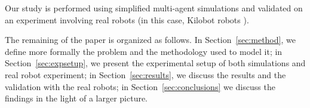 \documentclass[sigconf]{acmart}
\begin{document}
Our study is performed using simplified multi-agent simulations and validated on an experiment involving real robots (in this case, Kilobot robots \cite{Rubenstein2012kilobot}).

The remaining of the paper is organized as follows. In Section~\ref{sec:method}, we define more formally the problem and the methodology used to model it; in Section~\ref{sec:expsetup}, we present the experimental setup of both simulations and real robot experiment; in Section~\ref{sec:results}, we discuss the results and the validation with the real robots; in Section~\ref{sec:conclusions} we discuss the findings in the light of a larger picture.

\end{document}
